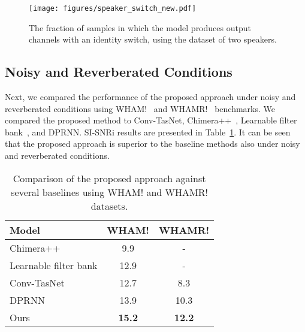 \documentclass{article}
\begin{document}
\begin{figure}[t]
  \centering
  \texttt{[image: figures/speaker\_switch\_new.pdf]}
    \caption{The fraction of samples in which the model produces output channels with an identity switch, using the dataset of two speakers.}
 \label{fig:switch}
\end{figure}

\subsection{Noisy and Reverberated Conditions}
Next, we compared the performance of the proposed approach under noisy and reverberated conditions using WHAM!~\cite{wham} and WHAMR!~\cite{whamr} benchmarks. We compared the proposed method to Conv-TasNet, Chimera++~\cite{wang2018alternative}, Learnable filter bank~\cite{pariente2020filterbank}, and DPRNN. SI-SNRi results are presented in Table~\ref{tab:wham_whamr}. It can be seen that the proposed approach is superior to the baseline methods also under noisy and reverberated conditions.


\begin{table}[t]
    \centering
    \caption{Comparison of the proposed approach against several baselines using WHAM! and WHAMR! datasets.}
    \label{tab:wham_whamr}
    \begin{tabular}{lcc}
    	\toprule
		Model&	WHAM! &	WHAMR! \\
		\midrule
		Chimera++ 				&	9.9 &	-\\
		Learnable filter bank 	&	12.9&	-\\
		Conv-TasNet 			&	12.7&	8.3\\
		DPRNN					&	13.9&	10.3\\
		Ours 					&	\bf 15.2&	\bf 12.2\\
		\bottomrule
	\end{tabular}
\end{table}
\end{document}
